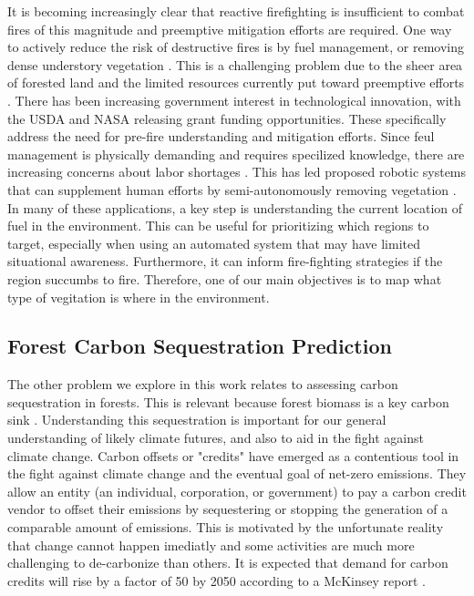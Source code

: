 It is becoming increasingly clear that reactive firefighting is insufficient to combat fires of this magnitude and preemptive mitigation efforts are required. One way to actively reduce the risk of destructive fires is by fuel management, or removing dense understory vegetation \cite{Fire2021FuelsManagement, WildlandFireResiliencyProgram20214Plan, Agriculture2019HazardousComplex}. This is a challenging problem due to the sheer area of forested land and the limited resources currently put toward preemptive efforts \cite{spreading_like_wildfire}.
There has been increasing government interest in technological innovation, with the USDA \cite{USDA2023USDAGrant} and NASA \cite{SPSO2023Research2023} releasing grant funding opportunities. These specifically address the need for pre-fire understanding and mitigation efforts. 
Since feul management is physically demanding and requires specilized knowledge, there are increasing concerns about labor shortages \cite{CommisionGlobalDivision}. This has led proposed robotic systems that can supplement human efforts by semi-autonomously removing vegetation \cite{couceiro2019semfire}. In many of these applications, a key step is understanding the current location of fuel in the environment. This can be useful for prioritizing which regions to target, especially when using an automated system that may have limited situational awareness. Furthermore, it can inform fire-fighting strategies if the region succumbs to fire. Therefore, one of our main objectives is to map what type of vegitation is where in the environment.

\subsection{Forest Carbon Sequestration Prediction}
The other problem we explore in this work relates to assessing carbon sequestration in forests. This is relevant because forest biomass is a key carbon sink \cite{Griscom2017NaturalSolutions}. Understanding this sequestration is important for our general understanding of likely climate futures, and also to aid in the fight against climate change. Carbon offsets or "credits" have emerged as a contentious tool in the fight against climate change and the eventual goal of net-zero emissions. They allow an entity (an individual, corporation, or government) to pay a carbon credit vendor to offset their emissions by sequestering or stopping the generation of a comparable amount of emissions. This is motivated by the unfortunate reality that change cannot happen imediatly and some activities are much more challenging to de-carbonize than others. It is expected that demand for carbon credits will rise by a factor of 50 by 2050 according to a McKinsey report \cite{Blaufelder2021AChallenge}. 

